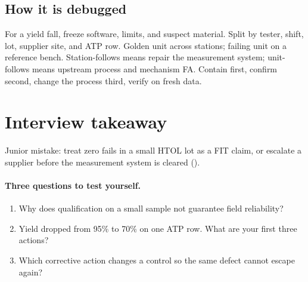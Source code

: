 \subsection{How it is debugged}
\label{sec:reliability-how-debugged}

For a yield fall, freeze software, limits, and suspect material. Split by tester,
shift, lot, supplier site, and ATP row. Golden unit across stations; failing unit
on a reference bench. Station-follows means repair the measurement system;
unit-follows means upstream process and mechanism FA. Contain first, confirm
second, change the process third, verify on fresh data.


\section{Interview takeaway}
\label{sec:reliability-design-review}


Junior mistake: treat zero fails in a small HTOL lot as a FIT claim, or escalate
a supplier before the measurement system is cleared
().

\paragraph{Three questions to test yourself.}
\begin{enumerate}
\item Why does qualification on a small sample not guarantee field reliability?
\item Yield dropped from 95\% to 70\% on one ATP row. What are your first three
      actions?
\item Which corrective action changes a control so the same defect cannot escape
      again?
\end{enumerate}

